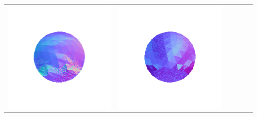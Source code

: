 \begin{center}
\begin{tabularx}{\linewidth}{@{}Y@{}Y@{}Y@{}Y@{}Y@{}Y@{}}
\includegraphics[width=\linewidth]{semisynthetic/20160617_1_yu_out.png} &
\includegraphics[width=\linewidth]{semisynthetic/20160617_1_dpsn_out.png} &

\end{tabularx}
\end{center}
